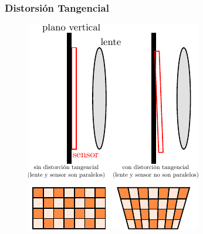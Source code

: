     

\begin{frame}
    \frametitle{Distorsión Tangencial}
    \footnotesize
    \begin{figure}
        \includegraphics[width=0.4\columnwidth]{images/camera/tangential_distortion2.pdf}\\
    \end{figure}
    
\end{frame}

